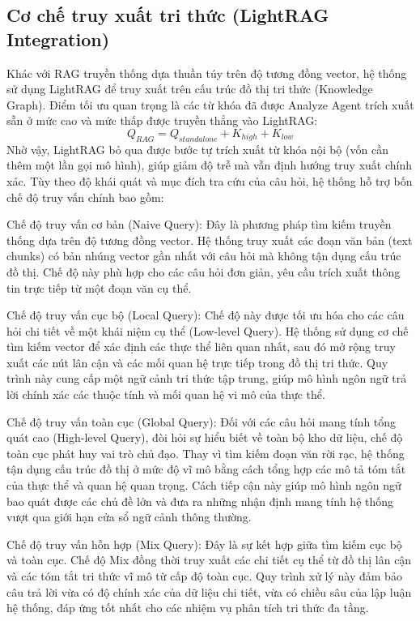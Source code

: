 \subsection{Cơ chế truy xuất tri thức (LightRAG Integration)}
Khác với RAG truyền thống dựa thuần túy trên độ tương đồng vector, hệ thống sử dụng LightRAG để truy xuất trên cấu trúc đồ thị tri thức (Knowledge Graph). Điểm tối ưu quan trọng là các từ khóa đã được Analyze Agent trích xuất sẵn ở mức cao và mức thấp được truyền thẳng vào LightRAG:
$$Q_{RAG} = Q_{standalone} + K_{high} + K_{low}$$
Nhờ vậy, LightRAG bỏ qua được bước tự trích xuất từ khóa nội bộ (vốn cần thêm một lần gọi mô hình), giúp giảm độ trễ mà vẫn định hướng truy xuất chính xác. Tùy theo độ khái quát và mục đích tra cứu của câu hỏi, hệ thống hỗ trợ bốn chế độ truy vấn chính bao gồm:

\indent Chế độ truy vấn cơ bản (Naive Query): Đây là phương pháp tìm kiếm truyền thống dựa trên độ tương đồng vector. Hệ thống truy xuất các đoạn văn bản (text chunks) có bản nhúng vector gần nhất với câu hỏi mà không tận dụng cấu trúc đồ thị. Chế độ này phù hợp cho các câu hỏi đơn giản, yêu cầu trích xuất thông tin trực tiếp từ một đoạn văn cụ thể.

\indent Chế độ truy vấn cục bộ (Local Query): Chế độ này được tối ưu hóa cho các câu hỏi chi tiết về một khái niệm cụ thể (Low-level Query). Hệ thống sử dụng cơ chế tìm kiếm vector để xác định các thực thể liên quan nhất, sau đó mở rộng truy xuất các nút lân cận và các mối quan hệ trực tiếp trong đồ thị tri thức. Quy trình này cung cấp một ngữ cảnh tri thức tập trung, giúp mô hình ngôn ngữ trả lời chính xác các thuộc tính và mối quan hệ vi mô của thực thể.

\indent Chế độ truy vấn toàn cục (Global Query): Đối với các câu hỏi mang tính tổng quát cao (High-level Query), đòi hỏi sự hiểu biết về toàn bộ kho dữ liệu, chế độ toàn cục phát huy vai trò chủ đạo. Thay vì tìm kiếm đoạn văn rời rạc, hệ thống tận dụng cấu trúc đồ thị ở mức độ vĩ mô bằng cách tổng hợp các mô tả tóm tắt của thực thể và quan hệ quan trọng. Cách tiếp cận này giúp mô hình ngôn ngữ bao quát được các chủ đề lớn và đưa ra những nhận định mang tính hệ thống vượt qua giới hạn cửa sổ ngữ cảnh thông thường.

\indent Chế độ truy vấn hỗn hợp (Mix Query): Đây là sự kết hợp giữa tìm kiếm cục bộ và toàn cục. Chế độ Mix đồng thời truy xuất các chi tiết cụ thể từ đồ thị lân cận và các tóm tắt tri thức vĩ mô từ cấp độ toàn cục. Quy trình xử lý này đảm bảo câu trả lời vừa có độ chính xác của dữ liệu chi tiết, vừa có chiều sâu của lập luận hệ thống, đáp ứng tốt nhất cho các nhiệm vụ phân tích tri thức đa tầng.

